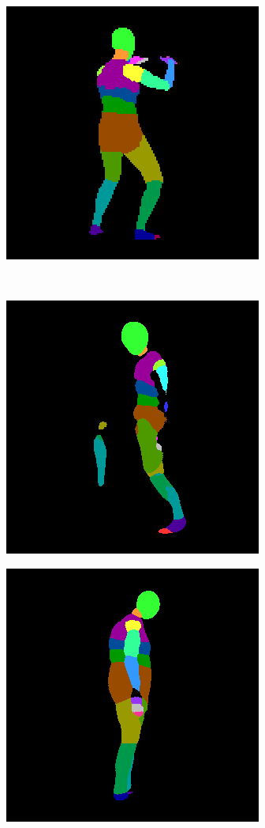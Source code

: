 \documentclass[12pt,a4paper]{article}
\begin{document}
\begin{figure}
\begin{subfigure}{.19\textwidth}
\end{subfigure}
\begin{subfigure}{.19\textwidth}
  \centering
  \includegraphics[scale=0.3]{ung_133_25_c0001_segm_29.png}\\
\end{subfigure}\\
\begin{subfigure}{.198\textwidth}
\centering
  \includegraphics[scale=0.295]{36_04_c0001_segm_30_seg.png}
\end{subfigure}%
\begin{subfigure}{.19\textwidth}
  \centering
  \includegraphics[scale=0.295]{36_16_c0002_segm_34_seg.png}

\end{subfigure}
\end{figure}
\end{document}
